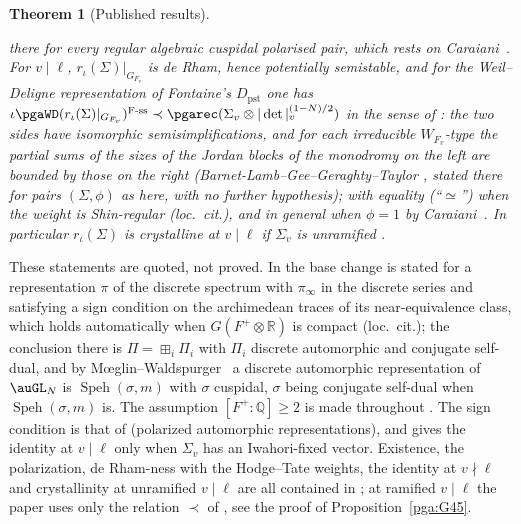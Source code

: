 \documentclass[10pt]{amsart}
\newtheorem{theorem}{Theorem}[section]
\theoremstyle{definition}
\theoremstyle{remark}
\newcommand{\R}{\mathbb R}
\newcommand{\Q}{\mathbb Q}
\begin{document}
\begin{theorem}[Published results]
\begin{enumerate}
there for every regular algebraic cuspidal polarised pair, which rests on
Caraiani~\cite{CaraianiDuke}. For $v\mid\ell$, $r_\iota(\Sigma)|_{G_{F_v}}$ is de Rham, hence
potentially semistable, and for the Weil--Deligne representation of Fontaine's $D_{\mathrm{pst}}$
one has $\iota\pgaWD(r_\iota(\Sigma)|_{G_{F_v}})^{\mathrm{F\text{-}ss}}\prec\pgarec(\Sigma_v\otimes
|\det|_v^{(1-N)/2})$ in the sense of \cite[\S1]{BLGGTlp2}: the two sides have isomorphic
semisimplifications, and for each irreducible $W_{F_v}$-type the partial sums of the sizes of
the Jordan blocks of the monodromy on the left are bounded by those on the right
(Barnet-Lamb--Gee--Geraghty--Taylor \cite[Theorem~A]{BLGGTlp2}, stated there for pairs
$(\Sigma,\phi)$ as here, with no further hypothesis); with equality (``$\simeq$'') when the
weight is Shin-regular (loc.\ cit.), and in general when $\phi=1$ by
Caraiani~\cite[Theorem~1.1]{CaraianiANT}. In particular $r_\iota(\Sigma)$ is crystalline at
$v\mid\ell$ if $\Sigma_v$ is unramified \cite[Thm.~2.1.1(4)]{BLGGT}.
\end{enumerate}
\end{theorem}
These statements are quoted, not proved. In \cite{Labesse} the base change is stated
for a representation $\pi$ of the discrete spectrum with $\pi_\infty$ in the discrete series and
satisfying a sign condition on the archimedean traces of its near-equivalence class, which
holds automatically when $G(F^+\otimes\R)$ is compact (loc.\ cit.); the conclusion there is
$\Pi=\boxplus_i\Pi_i$ with $\Pi_i$ discrete automorphic and conjugate self-dual, and by
M\oe glin--Waldspurger~\cite[Introduction, Th\'eor\`eme, p.~606]{MW89} a discrete automorphic representation of $\auGL_N$ is
$\operatorname{Speh}(\sigma,m)$ with $\sigma$ cuspidal, $\sigma$ being conjugate self-dual when
$\operatorname{Speh}(\sigma,m)$ is. The assumption $[F^+:\Q]\ge2$ is made throughout
\cite{Labesse}. The sign condition is that of \cite[\S2.1]{BLGGT}
(polarized automorphic representations), and \cite[Theorem~2.1.1]{BLGGT} gives the identity at
$v\mid\ell$ only when $\Sigma_v$ has an Iwahori-fixed vector. Existence, the polarization,
de Rham-ness with the Hodge--Tate weights, the identity at $v\nmid\ell$ and crystallinity at
unramified $v\mid\ell$ are all contained in \cite[Theorem~2.1.1(1)--(4)]{BLGGT}; at ramified
$v\mid\ell$ the paper uses only the relation $\prec$ of \cite[Theorem~A]{BLGGTlp2}, see the proof
of Proposition~\ref{pga:G45}.
\end{document}
